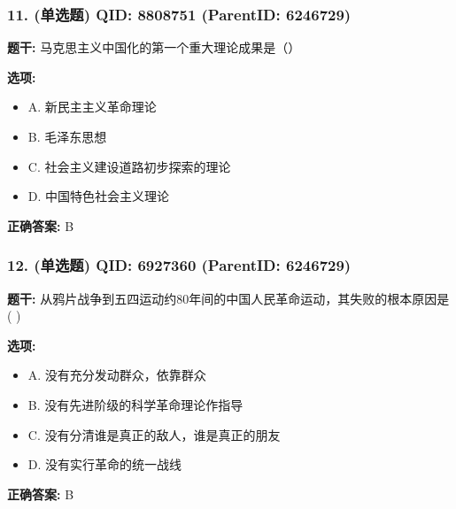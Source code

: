 \documentclass[12pt,UTF8]{ctexart}
\begin{document}
\subsubsection*{11. (单选题) \small QID: 8808751 (ParentID: 6246729)}

\textbf{题干:}
马克思主义中国化的第一个重大理论成果是（）



\textbf{选项:}
\begin{itemize}[leftmargin=*]

  \item A. 新民主主义革命理论

  \item B. 毛泽东思想

  \item C. 社会主义建设道路初步探索的理论

  \item D. 中国特色社会主义理论

\end{itemize}

\textbf{正确答案:}
B

\vspace{0.3em}\hrulefill\vspace{0.7em}

\subsubsection*{12. (单选题) \small QID: 6927360 (ParentID: 6246729)}

\textbf{题干:}
从鸦片战争到五四运动约80年间的中国人民革命运动，其失败的根本原因是(   )



\textbf{选项:}
\begin{itemize}[leftmargin=*]

  \item A. 没有充分发动群众，依靠群众

  \item B. 没有先进阶级的科学革命理论作指导

  \item C. 没有分清谁是真正的敌人，谁是真正的朋友

  \item D. 没有实行革命的统一战线

\end{itemize}

\textbf{正确答案:}
B

\vspace{0.3em}\hrulefill\vspace{0.7em}
\end{document}
